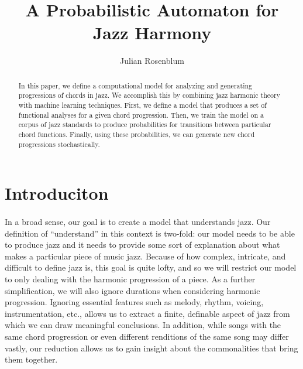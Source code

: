 \documentclass[]{article}
\title{A Probabilistic Automaton for Jazz Harmony}
\author{Julian Rosenblum}
\begin{document}
\maketitle

\begin{abstract}
In this paper, we define a computational model for analyzing and generating progressions of chords in jazz.  We accomplish this by combining jazz harmonic theory with machine learning techniques.  First, we define a model that produces a set of functional analyses for a given chord progression.  Then, we train the model on a corpus of jazz standards to produce probabilities for transitions between particular chord functions.  Finally, using these probabilities, we can generate new chord progressions stochastically.
\end{abstract}

\section{Introduciton}
\paragraph{} In a broad sense, our goal is to create a model that understands jazz.  Our definition of ``understand'' in this context is two-fold: our model needs to be able to produce jazz and it needs to provide some sort of explanation about what makes a particular piece of music jazz.  Because of how complex, intricate, and difficult to define jazz is, this goal is quite lofty, and so we will restrict our model to only dealing with the harmonic progression of a piece.  As a further simplification, we will also ignore durations when considering harmonic progression.  Ignoring essential features such as melody, rhythm, voicing, instrumentation, etc., allows us to extract a finite, definable aspect of jazz from which we can draw meaningful conclusions.  In addition, while songs with the same chord progression or even different renditions of the same song may differ vastly, our reduction allows us to gain insight about the commonalities that bring them together.
\end{document}
